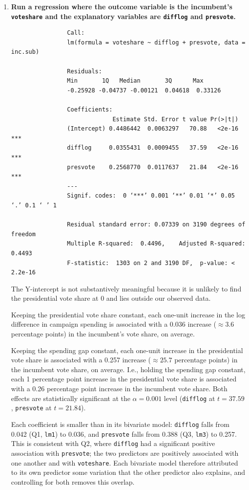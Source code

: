 \documentclass[12pt,letterpaper]{article}
\begin{document}
	\begin{enumerate}
		\item \textbf{Run a regression where the outcome variable is the incumbent's \texttt{voteshare} and the explanatory variables are \texttt{difflog} and \texttt{presvote}.} 
		
			
			
			\begin{verbatim}
				Call:
				lm(formula = voteshare ~ difflog + presvote, data = inc.sub)
				
				Residuals:
				Min       1Q   Median       3Q      Max 
				-0.25928 -0.04737 -0.00121  0.04618  0.33126 
				
				Coefficients:
				             Estimate Std. Error t value Pr(>|t|)        
				(Intercept) 0.4486442  0.0063297   70.88   <2e-16 ***
				difflog     0.0355431  0.0009455   37.59   <2e-16 ***
				presvote    0.2568770  0.0117637   21.84   <2e-16 ***
				---
				Signif. codes:  0 ‘***’ 0.001 ‘**’ 0.01 ‘*’ 0.05 ‘.’ 0.1 ‘ ’ 1
				
				Residual standard error: 0.07339 on 3190 degrees of freedom
				Multiple R-squared:  0.4496,	Adjusted R-squared:  0.4493 
				F-statistic:  1303 on 2 and 3190 DF,  p-value: < 2.2e-16
			\end{verbatim}
			
			\noindent The Y-intercept is not substantively meaningful because it is unlikely to find the presidential vote share at 0 and lies outside our observed data. 
			
			\noindent Keeping the presidential vote share constant, each one-unit increase in the log difference in campaign spending is associated with a 0.036 increase ($\approx 3.6$ percentage points) in the incumbent's vote share, on average. 
			
			\noindent Keeping the spending gap constant, each one-unit increase in the presidential vote share is associated with a 0.257 increase ($\approx 25.7 $ percentage points) in the incumbent vote share, on average. I.e., holding the spending gap constant, each 1 percentage point increase in the presidential vote share is associated with a 0.26 percentage point increase in the incumbent vote share. Both effects are statistically significant at the $\alpha = 0.001$ level (\texttt{difflog} at $t = 37.59$, \texttt{presvote} at $t = 21.84$). 
			
			\noindent Each coefficient is smaller than in its bivariate model: \texttt{difflog} falls from 0.042 (Q1, \texttt{lm1}) to 0.036, and \texttt{presvote} falls from 0.388 (Q3, \texttt{lm3}) to 0.257. This is consistent with Q2, where \texttt{difflog} had a significant positive association with \texttt{presvote}; the two predictors are positively associated with one another and with \texttt{voteshare}. Each bivariate model therefore attributed to its own predictor some variation that the other predictor also explains, and controlling for both removes this overlap.
			

\end{enumerate}
\end{document}
